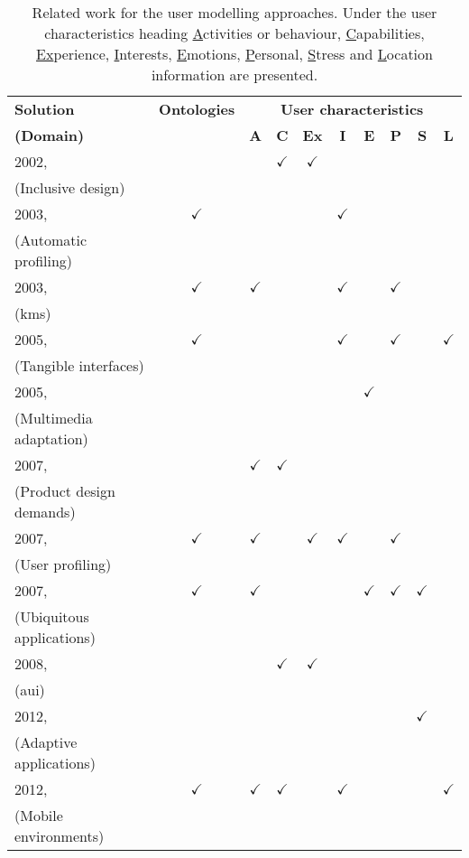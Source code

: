 \begin{table}
  \caption{Related work for the user modelling approaches. Under the user
 characteristics heading \underline{A}ctivities or behaviour, \underline{C}apabilities,
 \underline{Ex}perience,  \underline{I}nterests, \underline{E}motions,
 \underline{P}ersonal, \underline{S}tress and \underline{L}ocation information
 are presented.}
 \label{tbl:user_comparison}
\footnotesize
\centering
 \begin{tabular}{l c c c c c c c c c}
  \hline 
  \textbf{Solution} & \textbf{Ontologies} & \multicolumn{8}{c}{\textbf{User characteristics}}\\
  \textbf{(Domain)} & & \textbf{A} & \textbf{C} & \textbf{Ex} & \textbf{I} & \textbf{E} & \textbf{P} & \textbf{S} & \textbf{L} \\
  \hline
  
  2002,~\citet{gregor_designing_2002}		&  		& & $\checkmark$ & $\checkmark$ & & & & & \\
  (Inclusive design)\\
  2003,~\citet{gauch_ontology_based_2003}	& $\checkmark$	& & & & $\checkmark$ & & & &\\
  (Automatic profiling)\\ 
  2003,~\citet{razmerita_ontology_based_2003}	& $\checkmark$	& $\checkmark$ & & & $\checkmark$ & & $\checkmark$ & & \\
  (\ac{kms})\\				
  2005,~\citet{hatala_ontology_based_2005} 	& $\checkmark$ 	& & & & $\checkmark$ & & $\checkmark$ & & $\checkmark$ \\
  (Tangible interfaces)\\		
  2005,~\citet{pereira_triple_2005} 		& 		& & & & & $\checkmark$ & & &  \\
  (Multimedia adaptation)\\
  2007,~\citet{persad_characterising_2007} 	&   		& $\checkmark$ & $\checkmark$ & & & & & & \\
  (Product design demands)\\
  2007,~\citet{golemati_creating_2007} 		&  $\checkmark$   	& $\checkmark$ & & $\checkmark$ & $\checkmark$ & & $\checkmark$ & & \\
  (User profiling)\\
  2007,~\citet{heckmann_gumogeneral_2005} 	& $\checkmark$   	& $\checkmark$ & & & & $\checkmark$ & $\checkmark$ & $\checkmark$ & \\
  (Ubiquitous applications)\\
  2008,~\citet{casas_user_2008} 		&  		& & $\checkmark$ & $\checkmark$ & & & & & \\
  (\ac{aui})\\
  2012,~\citet{evers_achieving_2012} 		&  		& & & & & & & $\checkmark$ & \\
  (Adaptive applications)\\
  2012,~\citet{skillen2012ontological} 		&  $\checkmark$	& $\checkmark$ & $\checkmark$ & & $\checkmark$ & & & & $\checkmark$ \\
  (Mobile environments)\\
  \hline

\end{tabular}
\end{table}